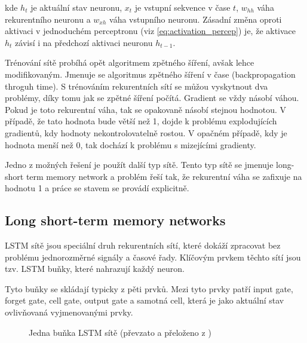 \documentclass[FM,BP,fonts]{tulthesis}
\begin{document}
kde $h_t$ je aktuální stav neuronu, $x_t$ je vstupní sekvence v čase $t$, $w_{hh}$ váha rekurentního neuronu a $w_{xh}$ váha vstupního neuronu. Zásadní změna oproti aktivaci v jednoduchém perceptronu (viz \ref{eq:activation_percep})  je, že aktivace $h_t$ závisí i na předchozí aktivaci neuronu $h_{t-1}$.

Trénování sítě probíhá opět algoritmem zpětného šíření, avšak lehce modifikovaným. Jmenuje se algoritmus zpětného šíření v čase (backpropagation throguh time). S trénováním rekurentních sítí se můžou vyskytnout dva problémy, díky tomu jak se zpětné šíření počítá. \cite{martinpilatRNN} Gradient se vždy násobí váhou. Pokud je toto rekurentní váha, tak se opakovaně násobí stejnou hodnotou. V případě, že tato hodnota bude větší než 1, dojde k problému explodujících gradientů, kdy hodnoty nekontrolovatelně rostou. V opačném případě, kdy je hodnota menší než 0, tak dochází k problému s mizejícími gradienty.

Jedno z možných řešení je použít další typ sítě. Tento typ sítě se jmenuje long-short term memory network a problém řeší tak, že rekurentní váha se zafixuje na hodnotu 1 a práce se stavem se provádí explicitně.



\subsection{Long short-term memory networks}\label{nn-lstm}
LSTM sítě jsou speciální druh rekurentních sítí, které dokáží zpracovat  bez problému jednorozměrné signály a časové řady. Klíčovým prvkem těchto sítí jsou tzv. LSTM buňky, které nahrazují každý neuron. 

Tyto buňky se skládají typicky z pěti prvků. Mezi tyto prvky patří input gate, forget gate, cell gate, output gate a samotná cell, která je jako aktuální stav ovlivňovaná vyjmenovanými prvky.

\begin{figure}[htbp]
	\centering
	\caption{Jedna buňka LSTM sítě (převzato a přeloženo z \cite{colah})}
	\label{fig:my_graph}
\end{figure}
\end{document}
